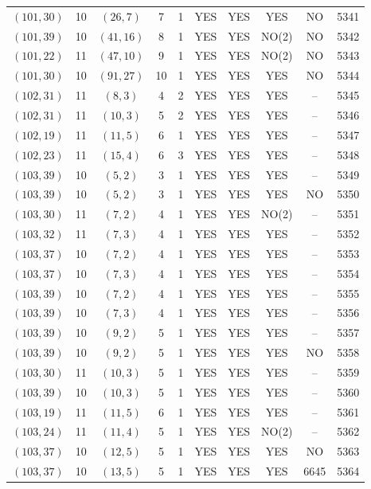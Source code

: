 \begin{longtable}{|c|c|c|c|c|c|c|c|c|c|}
$(101, 30)$ & 10 & $(26, 7)$ & 7 & 1 & YES & YES & YES & NO & 5341\\
$(101, 39)$ & 10 & $(41, 16)$ & 8 & 1 & YES & YES & NO(2) & NO & 5342\\
$(101, 22)$ & 11 & $(47, 10)$ & 9 & 1 & YES & YES & NO(2) & NO & 5343\\
$(101, 30)$ & 10 & $(91, 27)$ & 10 & 1 & YES & YES & YES & NO & 5344\\
$(102, 31)$ & 11 & $(8, 3)$ & 4 & 2 & YES & YES & YES & -- & 5345\\
$(102, 31)$ & 11 & $(10, 3)$ & 5 & 2 & YES & YES & YES & -- & 5346\\
$(102, 19)$ & 11 & $(11, 5)$ & 6 & 1 & YES & YES & YES & -- & 5347\\
$(102, 23)$ & 11 & $(15, 4)$ & 6 & 3 & YES & YES & YES & -- & 5348\\
$(103, 39)$ & 10 & $(5, 2)$ & 3 & 1 & YES & YES & YES & -- & 5349\\
$(103, 39)$ & 10 & $(5, 2)$ & 3 & 1 & YES & YES & YES & NO & 5350\\
$(103, 30)$ & 11 & $(7, 2)$ & 4 & 1 & YES & YES & NO(2) & -- & 5351\\
$(103, 32)$ & 11 & $(7, 3)$ & 4 & 1 & YES & YES & YES & -- & 5352\\
$(103, 37)$ & 10 & $(7, 2)$ & 4 & 1 & YES & YES & YES & -- & 5353\\
$(103, 37)$ & 10 & $(7, 3)$ & 4 & 1 & YES & YES & YES & -- & 5354\\
$(103, 39)$ & 10 & $(7, 2)$ & 4 & 1 & YES & YES & YES & -- & 5355\\
$(103, 39)$ & 10 & $(7, 3)$ & 4 & 1 & YES & YES & YES & -- & 5356\\
$(103, 39)$ & 10 & $(9, 2)$ & 5 & 1 & YES & YES & YES & -- & 5357\\
$(103, 39)$ & 10 & $(9, 2)$ & 5 & 1 & YES & YES & YES & NO & 5358\\
$(103, 30)$ & 11 & $(10, 3)$ & 5 & 1 & YES & YES & YES & -- & 5359\\
$(103, 39)$ & 10 & $(10, 3)$ & 5 & 1 & YES & YES & YES & -- & 5360\\
$(103, 19)$ & 11 & $(11, 5)$ & 6 & 1 & YES & YES & YES & -- & 5361\\
$(103, 24)$ & 11 & $(11, 4)$ & 5 & 1 & YES & YES & NO(2) & -- & 5362\\
$(103, 37)$ & 10 & $(12, 5)$ & 5 & 1 & YES & YES & YES & NO & 5363\\
$(103, 37)$ & 10 & $(13, 5)$ & 5 & 1 & YES & YES & YES & 6645 & 5364\\

\end{longtable}
